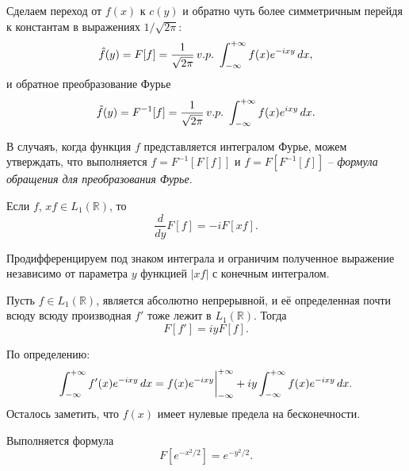
Сделаем переход от $f(x)$ к $c(y)$ и обратно чуть более симметричным перейдя к константам в выражениях $1/\sqrt{2\pi}$:
\begin{equation*}
    \hat{f}(y) = F[f] = \frac{1}{\sqrt{2\pi}} \, v.p.\ \int_{-\infty}^{+\infty} 
    f(x) e^{-ixy} \, d x,
\end{equation*}
и обратное преобразование Фурье
\begin{equation*}
    \tilde{f}(y) = F^{-1}[f] = \frac{1}{\sqrt{2\pi}} \, v. p. \ 
    \int_{-\infty}^{+\infty} f(x) e^{ixy} \d x.
\end{equation*}

В случаяъ, когда функция $f$ представляется интегралом Фурье, можем утверждать, что выполняется $f = F^{-1}[F[f]]$ и $f = F[F^{-1}[f]]$ -- \textit{формула обращения для преобразования Фурье}. 


\begin{to_thr}
    Если $f$, $xf \in L_1(\mathbb{R})$, то 
    \begin{equation*}
        \frac{d }{d y} F[f] = - i F[xf].
    \end{equation*}
\end{to_thr}

\begin{uproof}
    Продифференцируем под знаком интеграла и ограничим полученное выражение независимо от параметра $y$ функцией $|xf|$ с конечным интегралом. 
\end{uproof}


\begin{to_thr}
    Пусть $f \in L_1(\mathbb{R})$, является абсолютно непрерывной, и её определенная почти всюду всюду производная $f'$ тоже лежит в $L_1 (\mathbb{R})$. Тогда
    \begin{equation*}
        F[f'] = i y F[f].
    \end{equation*}
\end{to_thr}

\begin{uproof}
    По определению:
    \begin{equation*}
        \int_{-\infty}^{+\infty}  f'(x) e^{-ixy} \, d x = 
        f(x) e^{-ixy} \bigg|_{-\infty}^{+\infty} + iy \int_{-\infty}^{+\infty} 
        f(x) e^{-ixy} \, d x.
    \end{equation*}
    Осталось заметить, что $f(x)$ имеет нулевые предела на бесконечности. 
\end{uproof}



\begin{to_lem}
    Выполняется формула 
    \begin{equation*}
        F\left[e^{-x^2/2}\right] = e^{-y^2/2}. 
    \end{equation*}
\end{to_lem}
